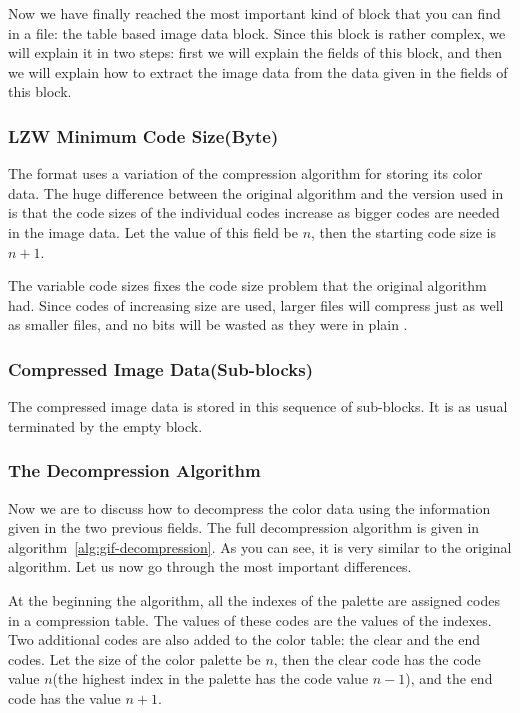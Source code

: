 Now we have finally reached the most important kind of block that you
can find in a \gif file: the table based image data block. Since this
block is rather complex, we will explain it in two steps: first we will
explain the fields of this block, and then we will explain how to
extract the image data from the data given in the fields of this
block.

\subsubsection{LZW Minimum Code Size(Byte)}

The \gif format uses a variation of the \lzw compression algorithm
for storing its color data. The huge difference between the
original \lzw algorithm and the version used in \gif is that the
code sizes of the individual codes increase as bigger codes are
needed in the image data.  Let the value of this field be $n$, then
the starting \lzw code size is $n + 1$.

The variable code sizes fixes the code size problem that the original
\lzw algorithm had. Since codes of increasing size are used, larger
files will compress just as well as smaller files, and no bits will be
wasted as they were in plain \lzw.

\subsubsection{Compressed Image Data(Sub-blocks)}

The compressed image data is stored in this sequence of sub-blocks. It
is as usual terminated by the empty block.

\subsubsection{The Decompression Algorithm}

Now we are to discuss how to decompress the color data using the
information given in the two previous fields. The full decompression
algorithm is given in algorithm~\ref{alg:gif-decompression}. As you
can see, it is very similar to the original \lzw algorithm. Let us
now go through the most important differences.

At the beginning the algorithm, all the indexes of the palette are
assigned codes in a compression table. The values of these codes are
the values of the indexes. Two additional codes are also added to the
color table: the clear and the end codes. Let the size of the color
palette be $n$, then the clear code has the code value $n$(the highest
index in the palette has the code value $n-1$), and the end code has
the value $n+1$.

